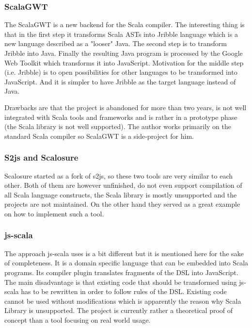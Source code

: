 \documentclass[12pt,a4paper]{report}
\begin{document}
\subsubsection*{ScalaGWT}

The ScalaGWT is a new backend for the Scala compiler. The interesting thing is that in the first step it transforms Scala ASTs into Jribble language which is a new language described as a "looser" Java. The second step is to transform Jribble into Java. Finally the resulting Java program is processed by the Google Web Toolkit \cite{Gwt} which transforms it into JavaScript. Motivation for the middle step (i.e. Jribble) is to open possibilities for other languages to be transformed into JavaScript. And it is simpler to have Jribble as the target language instead of Java.

Drawbacks are that the project is abandoned for more than two years, is not well integrated with Scala tools and frameworks and is rather in a prototype phase (the Scala library is not well supported). The author works primarily on the standard Scala compiler so ScalaGWT is a side-project for him.

\subsubsection*{S2js and Scalosure}

Scalosure started as a fork of s2js, so these two tools are very similar to each other. Both of them are however unfinished, do not even support compilation of all Scala language constructs, the Scala library is mostly unsupported and the projects are not maintained. On the other hand they served as a great example on how to implement such a tool.

\subsubsection*{js-scala}

The approach js-scala uses is a bit different but it is mentioned here for the sake of completeness. It is a domain specific language that can be embedded into Scala programs. Its compiler plugin translates fragments of the DSL into JavaScript. The main disadvantage is that existing code that should be transformed using js-scala has to be rewritten in order to follow rules of the DSL. Existing code cannot be used without modifications which is apparently the reason why Scala Library is unsupported. The project is currently rather a theoretical proof of concept than a tool focusing on real world usage.
\end{document}
